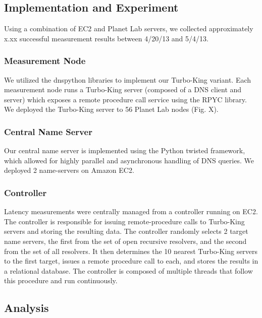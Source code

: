 \subsection{Implementation and Experiment}
\label{sec:impl-exper}

Using a combination of EC2 and Planet Lab servers, we collected approximately x.xx successful measurement results between 4/20/13 and 5/4/13.

\subsubsection{Measurement Node}
We utilized the dnspython libraries to implement our Turbo-King variant. Each measurement node runs a Turbo-King server (composed of a DNS client and server) which exposes a remote procedure call service using the RPYC library. We deployed the Turbo-King server to 56 Planet Lab nodes (Fig. X).

\subsubsection{Central Name Server}
Our central name server is implemented using the Python twisted framework, which allowed for highly parallel and asynchronous handling of DNS queries. We deployed 2 name-servers on Amazon EC2.

\subsubsection{Controller}
Latency measurements were centrally managed from a controller running on EC2. The controller is responsible for issuing remote-procedure calls to Turbo-King servers and storing the resulting data. The controller randomly selects 2 target name servers, the first from the set of open recursive resolvers, and the second from the set of all resolvers. It then determines the 10 nearest Turbo-King servers to the first target, issues a remote procedure call to each, and stores the results in a relational database. The controller is composed of multiple threads that follow this procedure and run continuously.

\subsection{Analysis}
\label{sec:analysis}

